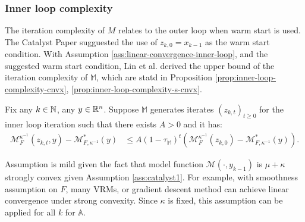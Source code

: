 \documentclass[12pt]{article}
\begin{document}
        \subsubsection{Inner loop complexity}
            The iteration complexity of $M$ relates to the outer loop when warm start is used. 
            The Catalyst Paper \cite{lin_universal_2015} sugguested the use of $z_{k, 0} = x_{k - 1}$ as the warm start condition. 
            With Assumption \ref{ass:linear-convergence-inner-loop}, and the suggested warm start condition,  Lin et al. derived the upper bound of the iteration complexity of $\mathbb M$, which are statd in Proposition \ref{prop:inner-loop-complexity-cnvx}, \ref{prop:inner-loop-complexity-s-cnvx}. 
            \begin{assumption}\label{ass:linear-convergence-inner-loop}
                Fix any $k \in \mathbb N$, any $y \in \mathbb R^n$. 
                Suppose $\mathbb M$ generates iterates $(z_{k, t})_{t \ge 0}$ for the inner loop iteration such that there exists $A > 0$ and it has: 
                \begin{align*}
                    \mathcal M_F^{\kappa^{-1}}(z_{k, t}, y) - \mathcal M^*_{F, \kappa^{-1}}(y) 
                    &\le 
                    A(1 - \tau_{\mathbb M})^t
                    \left(
                        \mathcal M_{F}^{\kappa^{-1}}(z_{k,0})
                        -
                        \mathcal M^*_{F, \kappa^{-1}}(y)
                    \right). 
                \end{align*}
            \end{assumption}
            \begin{remark}
                Assumption is mild given the fact that model function $\mathcal M(\cdot, y_{k - 1})$ is $\mu + \kappa$ strongly convex given Assumption \ref{ass:catalyst1}.
                For example, with smoothness assumption on $F$, many VRMs, or gradient descent method can achieve linear convergence under strong convexity. 
                Since $\kappa$ is fixed, this assumption can be applied for all $k$ for $\mathbb A$. 
            \end{remark}
            \begin{proposition}\label{prop:inner-loop-complexity-s-cnvx}
                
            \end{proposition}

            \begin{proposition}\label{prop:inner-loop-complexity-cnvx}

            \end{proposition}
\end{document}

